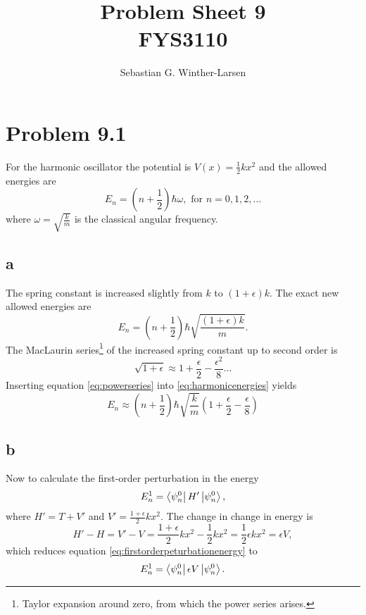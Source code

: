 \documentclass[11pt]{amsart}
\title[Problem Sheet 9]{Problem Sheet 9\\
		\large{FYS3110}}
\author[Winther-Larsen]{Sebastian G. Winther-Larsen}
\begin{document}
\maketitle

\section*{Problem 9.1}

For the harmonic oscillator the potential is $V(x) = \frac{1}{2}kx^2$ and the allowed energies are
\begin{equation}
E_n = \left(n + \frac{1}{2} \right)\hbar \omega, \text{ for } n = 0,1,2,\dots
\end{equation}
where $\omega = \sqrt{\frac{k}{m}}$ is the classical angular frequency. 

\subsection*{a}
The spring constant is increased slightly from $k$ to $(1+\epsilon)k$. The exact new allowed energies are
\begin{equation}
\label{eq:harmonicenergies}
E_n = \left(n + \frac{1}{2} \right)\hbar\sqrt{\frac{(1+\epsilon)k}{m}}.
\end{equation}
The MacLaurin series\footnote{Taylor expansion around zero, from which the power series arises.} of the increased spring constant up to second order is
\begin{equation}
\label{eq:powerseries}
\sqrt{1+\epsilon} \approx 1 + \frac{\epsilon}{2} - \frac{\epsilon^2}{8} \dots
\end{equation}
Inserting equation \ref{eq:powerseries} into \ref{eq:harmonicenergies} yields
\begin{equation}
E_n \approx \left(n + \frac{1}{2} \right)\hbar\sqrt{\frac{k}{m}}\left(1 + \frac{\epsilon}{2} - \frac{\epsilon}{8}\right) 
\end{equation}

\subsection*{b}
Now to calculate the first-order perturbation in the energy
\begin{equation}
\label{eq:firstorderpeturbationenergy}
E_n^1 = \bra{\psi_n^0}H'\ket{\psi_n^0},
\end{equation}
where $H' = T + V'$ and $V' = \frac{1+\epsilon}{2}kx^2$. The change in change in energy is
\begin{equation*}
H' - H = V' - V = \frac{1+\epsilon}{2}kx^2 - \frac{1}{2}kx^2 = \frac{1}{2}\epsilon kx^2 = \epsilon V, 
\end{equation*}
which reduces equation \ref{eq:firstorderpeturbationenergy} to
\begin{equation}
\label{eq:firstorderpeturbationenergy1}
E_n^1 = \bra{\psi_n^0}\epsilon V \ket{\psi_n^0}.
\end{equation}
\end{document}
